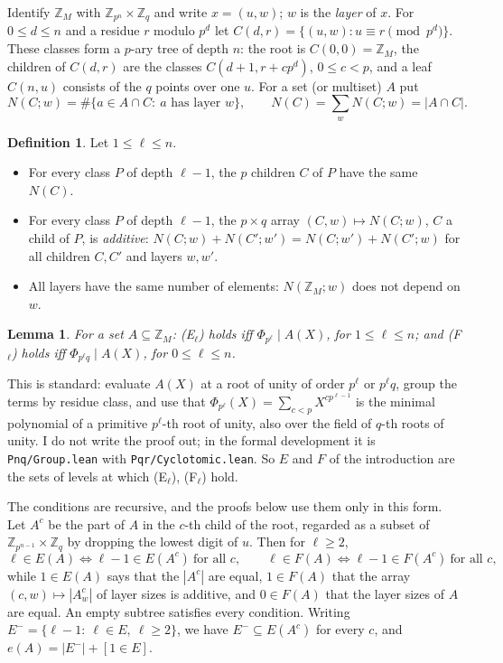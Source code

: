 \documentclass[11pt,a4paper]{amsart}
\newtheorem{lemma}[theorem]{Lemma}
\theoremstyle{definition}
\newtheorem{definition}[theorem]{Definition}
\theoremstyle{remark}
\newcommand{\Z}{\mathbb{Z}}
\newcommand{\lean}[1]{\texttt{#1}}
\begin{document}
Identify $\Z_M$ with $\Z_{p^n}\times\Z_q$ and write $x=(u,w)$; $w$ is the \emph{layer} of $x$. For $0\le d\le n$
and a residue $r$ modulo $p^d$ let $C(d,r)=\{(u,w): u\equiv r \pmod{p^d}\}$. These classes form a $p$-ary tree
of depth $n$: the root is $C(0,0)=\Z_M$, the children of $C(d,r)$ are the classes $C(d+1,r+cp^d)$,
$0\le c<p$, and a leaf $C(n,u)$ consists of the $q$ points over one $u$. For a set (or multiset) $A$ put
\[
 N(C;w)=\#\{a\in A\cap C:\ a \text{ has layer } w\},\qquad N(C)=\sum_w N(C;w)=|A\cap C| .
\]

\begin{definition}\label{Y:def:levels}
Let $1\le\ell\le n$.
\begin{itemize}
\item[(E$_\ell$)] For every class $P$ of depth $\ell-1$, the $p$ children $C$ of $P$ have the same $N(C)$.
\item[(F$_\ell$)] For every class $P$ of depth $\ell-1$, the $p\times q$ array $(C,w)\mapsto N(C;w)$, $C$ a
child of $P$, is \emph{additive}: $N(C;w)+N(C';w')=N(C;w')+N(C';w)$ for all children $C,C'$ and layers
$w,w'$.
\item[(F$_0$)] All layers have the same number of elements: $N(\Z_M;w)$ does not depend on $w$.
\end{itemize}
\end{definition}

\begin{lemma}\label{Y:lem:cyclo}
For a set $A\subseteq\Z_M$: {\rm (E$_\ell$)} holds iff $\Phi_{p^\ell}\mid A(X)$, for $1\le\ell\le n$; and
{\rm (F$_\ell$)} holds iff $\Phi_{p^\ell q}\mid A(X)$, for $0\le\ell\le n$.
\end{lemma}

This is standard: evaluate $A(X)$ at a root of unity of order $p^\ell$ or $p^\ell q$, group the terms by residue
class, and use that $\Phi_{p^\ell}(X)=\sum_{c<p}X^{cp^{\ell-1}}$ is the minimal polynomial of a primitive
$p^\ell$-th root of unity, also over the field of $q$-th roots of unity. I do not write the proof out; in the
formal development it is \lean{Pnq/Group.lean} with \lean{Pqr/Cyclotomic.lean}. So $E$ and $F$ of the
introduction are the sets of levels at which (E$_\ell$), (F$_\ell$) hold.

The conditions are recursive, and the proofs below use them only in this form. Let
$A^c$ be the part of $A$ in the $c$-th child of the root, regarded as a subset of
$\Z_{p^{n-1}}\times\Z_q$ by dropping the lowest digit of $u$. Then for $\ell\ge 2$,
\begin{equation}\label{Y:eq:rec}
 \ell\in E(A)\iff \ell-1\in E(A^c)\ \text{for all } c,\qquad
 \ell\in F(A)\iff \ell-1\in F(A^c)\ \text{for all } c ,
\end{equation}
while $1\in E(A)$ says that the $|A^c|$ are equal, $1\in F(A)$ that the array $(c,w)\mapsto|A^c_w|$ of layer
sizes is additive, and $0\in F(A)$ that the layer sizes of $A$ are equal. An empty subtree satisfies every
condition. Writing $E^-=\{\ell-1:\ \ell\in E,\ \ell\ge 2\}$, we have $E^-\subseteq E(A^c)$ for every $c$, and
$e(A)=|E^-|+[1\in E]$.
\end{document}
